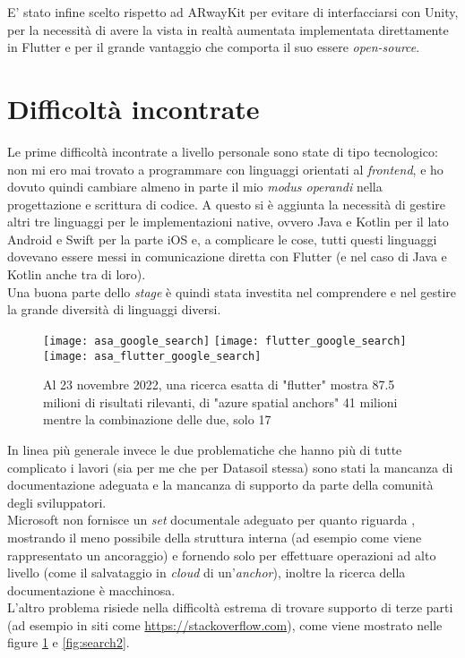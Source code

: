 E' stato infine scelto \aplug{} rispetto ad ARwayKit per evitare di interfacciarsi con Unity, per la necessità di avere la vista in realtà aumentata implementata direttamente in Flutter e per il grande vantaggio che comporta il suo essere \textit{open-source}.

\section{Difficoltà incontrate}
\label{sec:difficolta_incontrate}
Le prime difficoltà incontrate a livello personale sono state di tipo tecnologico: non mi ero mai trovato a programmare con linguaggi orientati al \textit{frontend}, e ho dovuto quindi cambiare almeno in parte il mio \textit{modus operandi} nella progettazione e scrittura di codice. A questo si è aggiunta la necessità di gestire altri tre linguaggi per le implementazioni native, ovvero Java e Kotlin per il lato Android e Swift per la parte iOS e, a complicare le cose, tutti questi linguaggi dovevano essere messi in comunicazione diretta con Flutter (e nel caso di Java e Kotlin anche tra di loro).\\ 
Una buona parte dello \textit{stage} è quindi stata investita nel comprendere e nel gestire la grande diversità di linguaggi diversi.

\begin{figure}[H]
  \centering
  \texttt{[image: asa\_google\_search]}\hfill
  \texttt{[image: flutter\_google\_search]}\\
  \texttt{[image: asa\_flutter\_google\_search]}
  \caption[Ricerca esatta Flutter e ASA 23 novembre]{Al 23 novembre 2022, una ricerca esatta di "flutter" mostra 87.5 milioni di risultati rilevanti, di "azure spatial anchors" 41 milioni mentre la combinazione delle due, solo 17}
\label{fig:search1}
\end{figure}

In linea più generale invece le due problematiche che hanno più di tutte complicato i lavori (sia per me che per Datasoil stessa) sono stati la mancanza di documentazione adeguata e la mancanza di supporto da parte della comunità degli sviluppatori.\\
Microsoft non fornisce un \textit{set} documentale adeguato per quanto riguarda \asa{}, mostrando il meno possibile della struttura interna (ad esempio come viene rappresentato un ancoraggio) e fornendo solo \api{} per effettuare operazioni ad alto livello (come il salvataggio in \textit{cloud} di un'\textit{anchor}), inoltre la ricerca della documentazione è macchinosa.\\
L'altro problema risiede nella difficoltà estrema di trovare supporto di terze parti (ad esempio in siti come \url{https://stackoverflow.com}), come viene mostrato nelle figure \ref{fig:search1} e \ref{fig:search2}.

